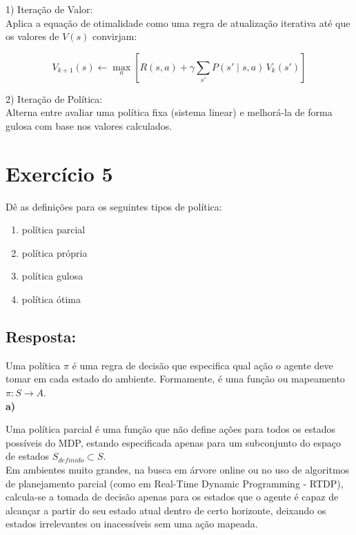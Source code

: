 \documentclass[a4paper,12pt]{article}
\begin{document}
1) Iteração de Valor: \\

Aplica a equação de otimalidade como uma regra de atualização iterativa até que os valores de $V(s)$ convirjam:

$$V_{k+1}(s) \leftarrow \max_{a} \left[ R(s, a) + \gamma \sum_{s'} P(s' \mid s, a) \, V_k(s') \right]$$

2) Iteração de Política:\\

Alterna entre avaliar uma política fixa (sistema linear) e melhorá-la de forma gulosa com base nos valores calculados.



\section*{Exercício 5}

Dê as definições para os seguintes tipos de política:

\begin{enumerate}[label=\alph*)]
	\item política parcial
	\item política própria
	\item política gulosa
	\item política ótima
\end{enumerate}	

\subsection*{Resposta:}

\bigskip

Uma política $\pi$ é uma regra de decisão que especifica qual ação o agente deve tomar em cada estado do ambiente. Formamente, é uma função ou mapeamento $\pi: S \to A$.\\

\textbf{a)}

Uma política parcial é uma função que não define ações para todos os estados possíveis do MDP, estando especificada apenas para um subconjunto do espaço de estados $S_{definido} \subset S$.\\

Em ambientes muito grandes, na busca em árvore online ou no uso de algoritmos de planejamento parcial (como em Real-Time Dynamic Programming - RTDP), calcula-se a tomada de decisão apenas para os estados que o agente é capaz de alcançar a partir do seu estado atual dentro de certo horizonte, deixando os estados irrelevantes ou inacessíveis sem uma ação mapeada.\\
\end{document}
